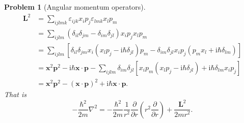 \documentclass{article}
\theoremstyle{1}
\newtheorem{problem}{Problem}
\newcommand{\ii}{\mathrm{i}}
\begin{document}
\begin{problem}[Angular momentum operators]
\begin{equation}
\begin{aligned}
\mathbf{L}^2 &= \sum_{ijlmk} \varepsilon_{ijk}x_i p_j \varepsilon_{lmk}x_l p_m \\
&= \sum_{ijlm} (\delta_{il}\delta_{jm} - \delta_{im}\delta_{jl})x_i p_j x_l p_m \\
&= \sum_{ijlm} [\delta_{il}\delta_{jm}x_i (x_l p_j - \ii\hbar\delta_{jl})p_m - \delta_{im}\delta_{jl}x_i p_j(p_m x_l + \ii\hbar\delta_{lm})]  \\
&= \mathbf{x}^2 \mathbf{p}^2 - \ii\hbar \mathbf{x} \cdot \mathbf{p} - \sum_{ijlm} \delta_{im}\delta_{jl}[x_i p_m(x_l p_j - \ii\hbar\delta_{jl}) + \ii\hbar\delta_{lm}x_i p_j] \\
&= \mathbf{x}^2 \mathbf{p}^2 - (\mathbf{x} \cdot \mathbf{p})^2 + \ii\hbar \mathbf{x} \cdot \mathbf{p}.
\end{aligned}
\end{equation}
That is 
\begin{equation}
    -\frac{\hbar ^2}{2m}\nabla^2=-\frac{\hbar^2}{2m}\frac{1}{r^2} \frac{\partial }{\partial r} \left( r^2 \frac{\partial }{\partial r} \right)+\frac{\mathbf{L}^2}{2mr^2}.
\end{equation}
\end{problem}
\end{document}
